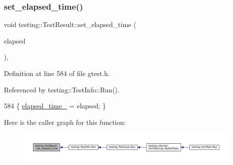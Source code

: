 \mbox{\label{classtesting_1_1TestResult_aa345325e5dea41609d17d7c614bf2b18}} 
\subsubsection{\texorpdfstring{set\+\_\+elapsed\+\_\+time()}{set\_elapsed\_time()}}
{\footnotesize\ttfamily void testing\+::\+Test\+Result\+::set\+\_\+elapsed\+\_\+time (\begin{DoxyParamCaption}\item[{\hyperlink{namespacetesting_a992de1d091ce660f451d1e8b3ce30fd6}{Time\+In\+Millis}}]{elapsed }\end{DoxyParamCaption})\hspace{0.3cm}{\ttfamily [inline]}, {\ttfamily [private]}}



Definition at line 584 of file gtest.\+h.



Referenced by testing\+::\+Test\+Info\+::\+Run().


\begin{DoxyCode}
584 \{ \hyperlink{classtesting_1_1TestResult_a739a8ca54db4be004ba748b11e82b056}{elapsed\_time\_} = elapsed; \}
\end{DoxyCode}
Here is the caller graph for this function\+:
\nopagebreak
\begin{figure}[H]
\begin{center}
\leavevmode
\includegraphics[width=350pt]{classtesting_1_1TestResult_aa345325e5dea41609d17d7c614bf2b18_icgraph}
\end{center}
\end{figure}
\mbox{\label{classtesting_1_1TestResult_a2964c3a12ef6ef9bcb47599374514432}} 
